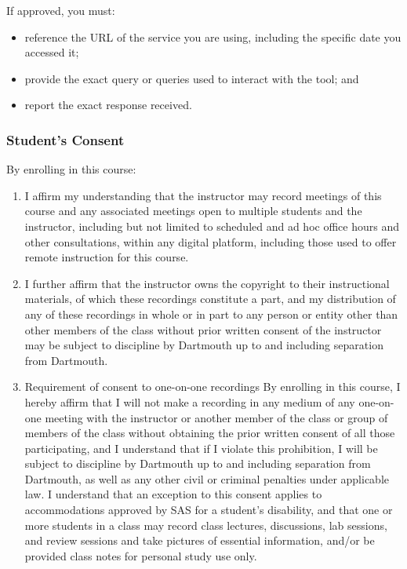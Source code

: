 \documentclass[
  11pt,
]{article}
\providecommand{\tightlist}{%
  \setlength{\itemsep}{0pt}\setlength{\parskip}{0pt}}\usepackage{longtable,booktabs,array}
\begin{document}
If approved, you must:

\begin{itemize}
\tightlist
\item
  reference the URL of the service you are using, including the specific
  date you accessed it;
\item
  provide the exact query or queries used to interact with the tool; and
\item
  report the exact response received.
\end{itemize}

\subsubsection{Student's Consent}\label{students-consent}

By enrolling in this course:

\begin{enumerate}
\def\labelenumi{\arabic{enumi}.}
\item
  I affirm my understanding that the instructor may record meetings of
  this course and any associated meetings open to multiple students and
  the instructor, including but not limited to scheduled and ad hoc
  office hours and other consultations, within any digital platform,
  including those used to offer remote instruction for this course.
\item
  I further affirm that the instructor owns the copyright to their
  instructional materials, of which these recordings constitute a part,
  and my distribution of any of these recordings in whole or in part to
  any person or entity other than other members of the class without
  prior written consent of the instructor may be subject to discipline
  by Dartmouth up to and including separation from Dartmouth.
\item
  Requirement of consent to one-on-one recordings By enrolling in this
  course, I hereby affirm that I will not make a recording in any medium
  of any one-on-one meeting with the instructor or another member of the
  class or group of members of the class without obtaining the prior
  written consent of all those participating, and I understand that if I
  violate this prohibition, I will be subject to discipline by Dartmouth
  up to and including separation from Dartmouth, as well as any other
  civil or criminal penalties under applicable law. I understand that an
  exception to this consent applies to accommodations approved by SAS
  for a student's disability, and that one or more students in a class
  may record class lectures, discussions, lab sessions, and review
  sessions and take pictures of essential information, and/or be
  provided class notes for personal study use only.
\end{enumerate}
\end{document}
